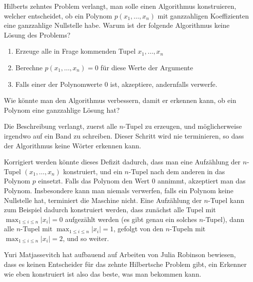Hilberts zehntes Problem verlangt, man solle einen Algorithmus
konstruieren, welcher entscheidet, ob ein Polynom $p(x_1,\dots,x_n)$
mit ganzzahligen
Koeffizienten eine ganzzahlige Nullstelle habe.
Warum ist der folgende Algorithmus keine Lösung des Problems?
\begin{enumerate}
\item Erzeuge alle in Frage kommenden Tupel $x_1,\dots,x_n$
\item Berechne $p(x_1,\dots,x_n)=0$ für diese Werte der Argumente
\item Falls einer der Polynomwerte $0$ ist, akzeptiere, andernfalls
verwerfe.
\end{enumerate}
Wie könnte man den Algorithmus verbessern, damit er erkennen kann,
ob ein Polynom eine ganzzahlige Lösung hat?


\begin{loesung}
Die Beschreibung verlangt, zuerst alle $n$-Tupel zu erzeugen,
und möglicherweise irgendwo auf ein Band zu schreiben. Dieser
Schritt wird nie terminieren, so dass der Algorithmus keine
Wörter erkennen kann.

Korrigiert werden könnte dieses Defizit dadurch, dass man eine
Aufzählung der $n$-Tupel $(x_1,\dots,x_n)$ konstruiert, und ein
$n$-Tupel nach dem anderen in das Polynom $p$
einsetzt. Falls das Polynom den Wert $0$ annimmt, akzeptiert man
das Polynom. Insbesondere kann man niemals verwerfen, falls
ein Polynom keine Nullstelle hat, terminiert die Maschine nicht.
Eine Aufzählung der $n$-Tupel kann zum Beispiel dadurch konstruiert
werden, dass zunächst alle Tupel mit
$\max_{1\le i\le n}|x_i|=0$
aufgezählt werden (es gibt genau ein solches $n$-Tupel),
dann alle $n$-Tupel mit
$\max_{1\le i\le n}|x_i|=1$,
gefolgt von den $n$-Tupeln mit
$\max_{1\le i\le n}|x_i|=2$, und so weiter.

Yuri Matjassevitch hat aufbauend auf Arbeiten von Julia Robinson bewiesen,
dass es
keinen Entscheider für das zehnte Hilbertsche Problem gibt,
ein Erkenner wie eben konstruiert ist also das beste, was
man bekommen kann.
\end{loesung}
